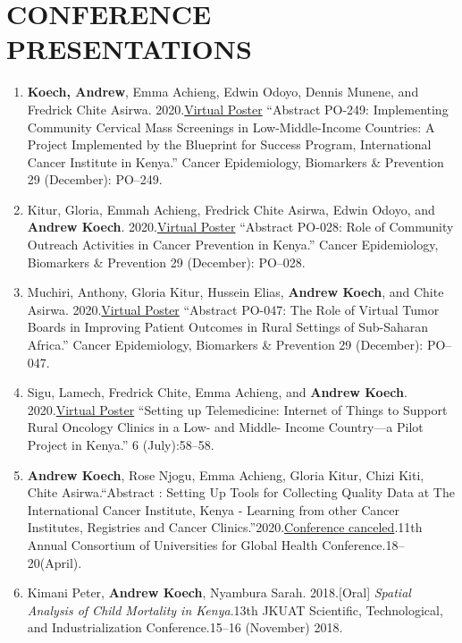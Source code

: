 \documentclass[13pt,]{article}
\begin{document}
\hypertarget{conference-presentations}{%
\section{\texorpdfstring{\textbf{CONFERENCE
PRESENTATIONS}}{CONFERENCE PRESENTATIONS}}\label{conference-presentations}}

\begin{enumerate}
\def\labelenumi{\arabic{enumi}.}
\item
  \textbf{Koech, Andrew}, Emma Achieng, Edwin Odoyo, Dennis Munene, and
  Fredrick Chite Asirwa.
  2020.\href{https://doi.org/10.1158/1538-7755.DISP20-PO-249}{Virtual
  Poster} ``Abstract PO-249: Implementing Community Cervical Mass
  Screenings in Low-Middle-Income Countries: A Project Implemented by
  the Blueprint for Success Program, International Cancer Institute in
  Kenya.'' Cancer Epidemiology, Biomarkers \& Prevention 29 (December):
  PO--249.
\item
  Kitur, Gloria, Emmah Achieng, Fredrick Chite Asirwa, Edwin Odoyo, and
  \textbf{Andrew Koech}.
  2020.\href{https://doi.org/10.1158/1538-7755.DISP20-PO-028}{Virtual
  Poster} ``Abstract PO-028: Role of Community Outreach Activities in
  Cancer Prevention in Kenya.'' Cancer Epidemiology, Biomarkers \&
  Prevention 29 (December): PO--028.
\item
  Muchiri, Anthony, Gloria Kitur, Hussein Elias, \textbf{Andrew Koech},
  and Chite Asirwa.
  2020.\href{https://doi.org/10.1158/1538-7755.DISP20-PO-047}{Virtual
  Poster} ``Abstract PO-047: The Role of Virtual Tumor Boards in
  Improving Patient Outcomes in Rural Settings of Sub-Saharan Africa.''
  Cancer Epidemiology, Biomarkers \& Prevention 29 (December): PO--047.
\item
  Sigu, Lamech, Fredrick Chite, Emma Achieng, and \textbf{Andrew Koech}.
  2020.\href{https://doi.org/10.1200/GO.20.54000}{Virtual Poster}
  ``Setting up Telemedicine: Internet of Things to Support Rural
  Oncology Clinics in a Low- and Middle- Income Country---a Pilot
  Project in Kenya.'' 6 (July):58--58.
\item
  \textbf{Andrew Koech}, Rose Njogu, Emma Achieng, Gloria Kitur, Chizi
  Kiti, Chite Asirwa.``Abstract : Setting Up Tools for Collecting
  Quality Data at The International Cancer Institute, Kenya - Learning
  from other Cancer Institutes, Registries and Cancer
  Clinics.''2020.\href{https://www.dropbox.com/s/lq0owvwya6dcjfh/1\%20CUGH\%202020\%20eBook_Abstracts_Global\%20Health\%20Education.pdf?dl=0}{Conference
  canceled}.11th Annual Consortium of Universities for Global Health
  Conference.18--20(April).
\item
  Kimani Peter, \textbf{Andrew Koech}, Nyambura Sarah. 2018.{[}Oral{]}
  \emph{Spatial Analysis of Child Mortality in Kenya}.13th JKUAT
  Scientific, Technological, and Industrialization Conference.15--16
  (November) 2018.
\end{enumerate}
\end{document}
